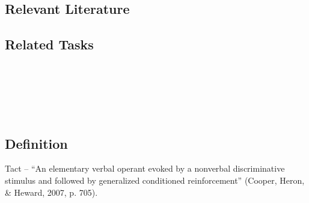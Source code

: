 \subsection{Relevant Literature}
\begin{refsection}
\nocite{test,alang2017police,clayton2018black}
\printbibliography[heading=none]
\end{refsection}
%
\subsection{Related Tasks}
\fourdNine{}\\
\fourdEleven{}\\
\fourFKTwentySeven{}\\
\fourFKTwentyEight{}\\
%
%
%
%
%
\section{\fourFKFourtyFive{}}
\subsection{Definition}
Tact – ``An elementary verbal operant evoked by a nonverbal discriminative stimulus and followed by generalized conditioned reinforcement'' (Cooper, Heron, \& Heward, 2007, p. 705).
%
